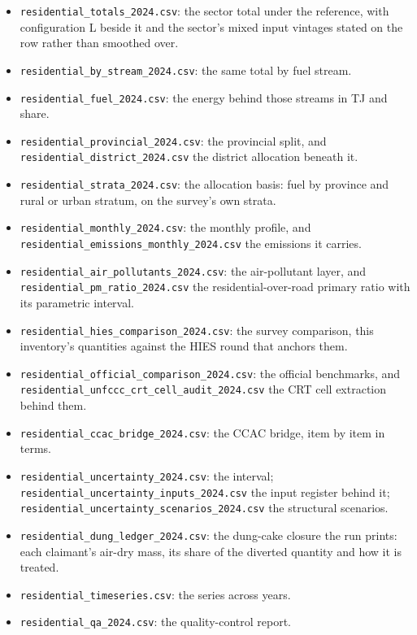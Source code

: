 \begin{itemize}\itemsep2pt
\item \texttt{residential\_\allowbreak totals\_\allowbreak 2024.csv}: the sector total under the reference, with configuration L beside it and the sector's mixed input vintages stated on the row rather than smoothed over.
\item \texttt{residential\_\allowbreak by\_\allowbreak stream\_\allowbreak 2024.csv}: the same total by fuel stream.
\item \texttt{residential\_\allowbreak fuel\_\allowbreak 2024.csv}: the energy behind those streams in TJ and share.
\item \texttt{residential\_\allowbreak provincial\_\allowbreak 2024.csv}: the provincial split, and \texttt{residential\_\allowbreak district\_\allowbreak 2024.csv} the district allocation beneath it.
\item \texttt{residential\_\allowbreak strata\_\allowbreak 2024.csv}: the allocation basis: fuel by province and rural or urban stratum, on the survey's own strata.
\item \texttt{residential\_\allowbreak monthly\_\allowbreak 2024.csv}: the monthly profile, and \texttt{residential\_\allowbreak emissions\_\allowbreak monthly\_\allowbreak 2024.csv} the emissions it carries.
\item \texttt{residential\_\allowbreak air\_\allowbreak pollutants\_\allowbreak 2024.csv}: the air-pollutant layer, and \texttt{residential\_\allowbreak pm\_\allowbreak ratio\_\allowbreak 2024.csv} the residential-over-road primary \PM{} ratio with its parametric interval.
\item \texttt{residential\_\allowbreak hies\_\allowbreak comparison\_\allowbreak 2024.csv}: the survey comparison, this inventory's quantities against the HIES round that anchors them.
\item \texttt{residential\_\allowbreak official\_\allowbreak comparison\_\allowbreak 2024.csv}: the official benchmarks, and \texttt{residential\_\allowbreak unfccc\_\allowbreak crt\_\allowbreak cell\_\allowbreak audit\_\allowbreak 2024.csv} the CRT cell extraction behind them.
\item \texttt{residential\_\allowbreak ccac\_\allowbreak bridge\_\allowbreak 2024.csv}: the CCAC bridge, item by item in \PM{} terms.
\item \texttt{residential\_\allowbreak uncertainty\_\allowbreak 2024.csv}: the interval; \texttt{residential\_\allowbreak uncertainty\_\allowbreak inputs\_\allowbreak 2024.csv} the input register behind it; \texttt{residential\_\allowbreak uncertainty\_\allowbreak scenarios\_\allowbreak 2024.csv} the structural scenarios.
\item \texttt{residential\_\allowbreak dung\_\allowbreak ledger\_\allowbreak 2024.csv}: the dung-cake closure the run prints: each claimant's air-dry mass, its share of the diverted quantity and how it is treated.
\item \texttt{residential\_\allowbreak timeseries.csv}: the series across years.
\item \texttt{residential\_\allowbreak qa\_\allowbreak 2024.csv}: the quality-control report.
\end{itemize}


